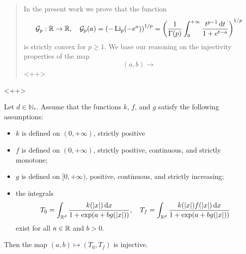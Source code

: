 \documentclass{article}
\begin{document}
\begin{abstract}
	In the present work we prove that the function\[
		\mathcal G_p:{\mathbb R}\to{\mathbb R},\quad \mathcal G_p(a) = \left( -\operatorname{Li}_p(-e^a) \right)^{1/p}=\left( \frac{1}{\Gamma(p)}\int_{0}^{+\infty}\frac{t^{p-1}{\,\mathrm dt}}{1+e^{t-a}} \right)^{1/p}
	\]
	is strictly convex for $p\ge1$. We base our reasoning on the injectivity properties of the map
	\[
		(a,b)\to
	\]<++>
\end{abstract}<++>
\begin{lemma}
	Let $d\in\mathbb N_*$. Assume that the functions $k$, $f$, and $g$ satisfy the following assumptions:
	\begin{itemize}
		\item $k$ is defined on $(0,+\infty)$, strictly positive
		\item $f$ is defined on $(0,+\infty)$, strictly positive, continuous, and strictly monotone;
		\item $g$ is defined on $[0,+\infty)$, positive, continuous, and strictly increasing;
		\item the integrals 
		\[
			T_0 = \int_{{\mathbb R^d}}^{}\frac{k(|x|){\,\mathrm{d} x}}{1+\exp(a+bg(|x|))},\quad T_f = \int_{{\mathbb R^d}}^{}\frac{k(|x|)f(|x|){\,\mathrm{d} x}}{1+\exp(a+bg(|x|))}
		\]
		exist for all $a\in{\mathbb R}$ and $b>0$.
	\end{itemize}
	Then the map $(a,b)\mapsto (T_0,T_f)$ is injective.
	\label{le:basic}
\end{lemma}
\end{document}
